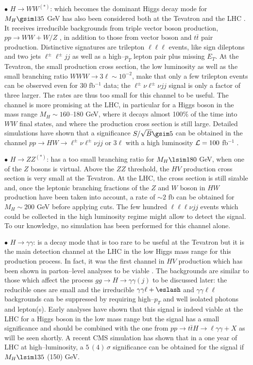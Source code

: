 $\bullet$ \underline{$H \to WW^{(*)}$}: which becomes the dominant Higgs
decay mode for $M_H \gsim 135$ GeV has also been considered both at the
Tevatron and the LHC \cite{pp-HW-lWW-LHC+Tev}. It receives irreducible
backgrounds from triple vector boson production, $pp \to WW+W/Z$
\cite{pp-bkg-VVV}, in addition to those from vector boson and $t\bar t$ pair
production. Distinctive signatures are trilepton $\ell \ell \ell$ events, like
sign dileptons and two jets $\ell^\pm \ell^\pm jj$ as well as a high--$p_T$
lepton pair plus missing $E_T$. At the Tevatron, the small production cross
section, the low luminosity as well as the small branching ratio $WWW \to 3\ell
\sim 10^{-2}$, make that only a few trilepton events can be observed even for 
30 fb$^{-1}$ data; the $\ell^\pm \nu \ell^\pm \nu jj$ signal
is only a factor of three larger.  The rates are thus too small for this
channel to be useful. The channel is more promising at the LHC, in particular
for a Higgs boson in the mass range $M_H \sim 160$--180 GeV, where it decays
almost 100\% of the time into $WW$ final states, and where the production cross
section is still large. Detailed simulations have shown that a significance
$S/\sqrt{B} \gsim 5$ can be obtained in the channel $pp \to HW \to \ell^\pm \nu
\ell^\pm \nu jj$  or $3\ell$ with a high luminosity ${\cal L}= 100$ fb$^{-1}$
\cite{pp-WHWW-sim}. \s

$\bullet$ \underline{$H \to ZZ^{(*)}$}: has a too small branching ratio for
$M_H \lsim 180$ GeV, when one of the $Z$ bosons is virtual. Above the $ZZ$
threshold, the $HV$ production cross section is very small at the Tevatron.
At the LHC, the cross section is still sizable and, once the leptonic branching
fractions of the $Z$ and $W$ boson in $HW$ production have been taken into 
account, a rate of $\sim 2$ fb can be obtained for $M_H\sim 200$ GeV before 
applying cuts. The few hundred $\ell \ell \ell \nu jj$ events which could be 
collected in the high luminosity regime might allow to detect the signal. To 
our knowledge, no simulation has been performed for this channel alone.\s 

$\bullet$ \underline{$H \to \gamma \gamma$}: is a decay mode that is too rare
to be useful at the Tevatron but it is the main detection channel at the LHC in
the low Higgs mass range for this production process. In fact, it was the first
channel in $HV$ production which has been shown in parton--level analyses to be
viable \cite{pp-HW-laa0,pp-HW-laa1}. The backgrounds are similar to those which
affect the process $gg \to H \to \gamma \gamma (j)$ to be discussed later: the
reducible ones are small \cite{pp-aal-Dubinin} and the irreducible $\gamma
\gamma \ell+\eslash$ and $\gamma \gamma \ell \ell$ backgrounds can be
suppressed by requiring high--$p_T$ and well isolated photons and lepton(s). 
Early analyses have shown that this signal is indeed viable at the LHC for a
Higgs boson in the low mass range \cite{ATLAS-TDR,CMS-TDR,pp-HWaa-sim} but the
signal has a small significance and should be combined with the one from $pp
\to t\bar t H \to \ell \gamma \gamma+ X$ as will be seen shortly.  A recent CMS
simulation \cite{pp-HWaa-simNew} has shown that in a one year of LHC at
high--luminosity,  a $5\, (4) \, \sigma$ significance can be obtained for the
signal if $M_H \lsim 135$ (150) GeV.\s

